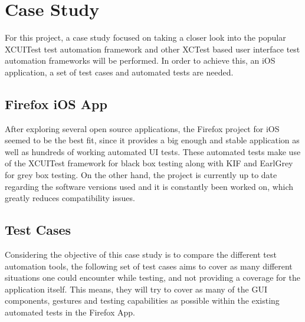 \chapter{Case Study}
\label{chapter3}
For this project, a case study focused on taking a closer look into the popular XCUITest test automation framework and other XCTest based user interface test automation frameworks will be performed. In order to achieve this, an iOS application, a set of test cases and automated tests are needed.


\section{Firefox iOS App}
After exploring several open source applications, the Firefox project for iOS seemed to be the best fit, since it provides a big enough and stable application as well as hundreds of working automated UI tests. These automated tests make use of the XCUITest framework for black box testing along with KIF and EarlGrey for grey box testing. On the other hand, the project is currently up to date regarding the software versions used and it is constantly been worked on, which greatly reduces compatibility issues. \cite{FirefoxAppiOS}

\section{Test Cases}
Considering the objective of this case study is to compare the different test automation tools, the following set of test cases aims to cover as many different situations one could encounter while testing, and not providing a coverage for the application itself. This means, they will try to cover as many of the GUI components, gestures and testing capabilities as possible within the existing automated tests in the Firefox App.

